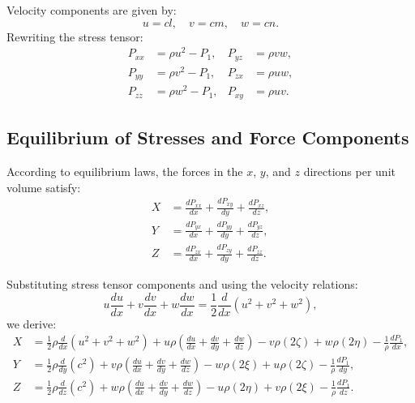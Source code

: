 \documentclass[a4paper,10pt]{article}
\begin{document}
    Velocity components are given by:
    \begin{equation*}
        u = c l, \quad v = c m, \quad w = c n.
    \end{equation*}
    Rewriting the stress tensor:
    \begin{align}
        P_{xx} &= \rho u^2 - P_1, & P_{yz} &= \rho v w, \\
        P_{yy} &= \rho v^2 - P_1, & P_{zx} &= \rho u w, \\
        P_{zz} &= \rho w^2 - P_1, & P_{xy} &= \rho u v.
    \end{align}

    \subsection*{Equilibrium of Stresses and Force Components}
    According to equilibrium laws, the forces in the $x$, $y$, and $z$ directions per unit volume satisfy:
    \begin{align}
        X &= \frac{d P_{xx}}{dx} + \frac{d P_{xy}}{dy} + \frac{d P_{xz}}{dz}, \\
        Y &= \frac{d P_{yx}}{dx} + \frac{d P_{yy}}{dy} + \frac{d P_{yz}}{dz}, \\
        Z &= \frac{d P_{zx}}{dx} + \frac{d P_{zy}}{dy} + \frac{d P_{zz}}{dz}.
    \end{align}

    Substituting stress tensor components and using the velocity relations:
    \begin{equation*}
        u \frac{du}{dx} + v \frac{dv}{dx} + w \frac{dw}{dx} = \frac{1}{2} \frac{d}{dx} (u^2 + v^2 + w^2),
    \end{equation*}
    we derive:
    \begin{align}
        X &= \frac{1}{2} \rho \frac{d}{dx} (u^2 + v^2 + w^2) + u \rho \left( \frac{du}{dx} + \frac{dv}{dy} + \frac{dw}{dz} \right) - v \rho (2 \zeta) + w \rho (2 \eta) - \frac{1}{\rho} \frac{dP_1}{dx}, \\
        Y &= \frac{1}{2} \rho \frac{d}{dy} (c^2) + v \rho \left( \frac{du}{dx} + \frac{dv}{dy} + \frac{dw}{dz} \right) - w \rho (2 \xi) + u \rho (2 \zeta) - \frac{1}{\rho} \frac{dP_1}{dy}, \\
        Z &= \frac{1}{2} \rho \frac{d}{dz} (c^2) + w \rho \left( \frac{du}{dx} + \frac{dv}{dy} + \frac{dw}{dz} \right) - u \rho (2 \eta) + v \rho (2 \xi) - \frac{1}{\rho} \frac{dP_1}{dz}.
    \end{align}
\end{document}
